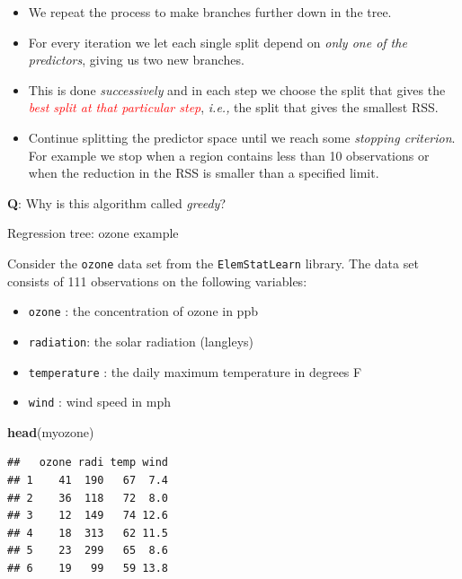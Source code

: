 \documentclass[10pt,ignorenonframetext,]{beamer}
\newenvironment{Shaded}{\begin{snugshade}}{\end{snugshade}}
\newcommand{\KeywordTok}[1]{\textcolor[rgb]{0.13,0.29,0.53}{\textbf{#1}}}
\newcommand{\NormalTok}[1]{#1}
\providecommand{\tightlist}{%
  \setlength{\itemsep}{0pt}\setlength{\parskip}{0pt}}
\begin{document}
\begin{frame}

\begin{itemize}
\item
  We repeat the process to make branches further down in the tree.
\item
  For every iteration we let each single split depend on \emph{only one
  of the predictors}, giving us two new branches.
\item
  This is done \emph{successively} and in each step we choose the split
  that gives the
  \emph{\textcolor{red}{best split at that particular step}},
  \emph{i.e.,} the split that gives the smallest RSS.
\item
  Continue splitting the predictor space until we reach some
  \emph{stopping criterion}. For example we stop when a region contains
  less than 10 observations or when the reduction in the RSS is smaller
  than a specified limit.
\end{itemize}

\vspace{1mm}

\textbf{Q}: Why is this algorithm called \emph{greedy}?

\end{frame}

\begin{frame}[fragile]

\begin{block}{Regression tree: ozone example}

\vspace{2mm}

Consider the \texttt{ozone} data set from the \texttt{ElemStatLearn}
library. The data set consists of 111 observations on the following
variables:

\begin{itemize}
\tightlist
\item
  \texttt{ozone} : the concentration of ozone in ppb
\item
  \texttt{radiation}: the solar radiation (langleys)
\item
  \texttt{temperature} : the daily maximum temperature in degrees F
\item
  \texttt{wind} : wind speed in mph
\end{itemize}

\vspace{2mm}

\scriptsize

\begin{Shaded}
\begin{Highlighting}[]
\KeywordTok{head}\NormalTok{(myozone)}
\end{Highlighting}
\end{Shaded}

\begin{verbatim}
##   ozone radi temp wind
## 1    41  190   67  7.4
## 2    36  118   72  8.0
## 3    12  149   74 12.6
## 4    18  313   62 11.5
## 5    23  299   65  8.6
## 6    19   99   59 13.8
\end{verbatim}

\end{block}

\end{frame}
\end{document}
